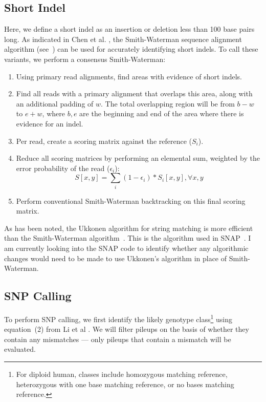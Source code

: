 \documentclass[11pt]{article}
\begin{document}
\subsection{Short Indel}
\label{sec:short-indel}

Here, we define a short indel as an insertion or deletion less than 100 base pairs long. As indicated in Chen et al.
\cite{chen09}, the Smith-Waterman sequence alignment algorithm (see~\cite{smith81}) can be used for accurately
identifying short indels. To call these variants, we perform a consensus Smith-Waterman:

\begin{enumerate}
\item Using primary read alignments, find areas with evidence of short indels.
\item Find all reads with a primary alignment that overlaps this area, along with an additional padding of $w$. The total
overlapping region will be from $b - w$ to $e + w$, where $b, e$ are the beginning and end of the area where there is
evidence for an indel.
\item Per read, create a scoring matrix against the reference ($S_i$).
\item Reduce all scoring matrices by performing an elemental sum, weighted by the error probability of the read
($\epsilon_i$):
$$
S [x, y] = \sum_i (1 - \epsilon_i) * S_i [x,y] , \forall x, y
$$
\item Perform conventional Smith-Waterman backtracking on this final scoring matrix.
\end{enumerate}

As has been noted, the Ukkonen algorithm for string matching is more efficient than the Smith-Waterman
algorithm~\cite{ukkonen85}. This is the algorithm used in SNAP~\cite{zaharia11}. I am currently looking into the SNAP
code to identify whether any algorithmic changes would need to be made to use Ukkonen's algorithm in place of
Smith-Waterman.

\subsection{SNP Calling}
\label{sec:SNP-calling}

To perform SNP calling, we first identify the likely genotype class\footnote{For diploid human, classes include homozygous
matching reference, heterozygous with one base matching reference, or no bases matching reference.} using equation~(2)
from Li et al \cite{li11}. We will filter pileups on the basis of whether they contain any mismatches --- only pileups that contain
a mismatch will be evaluated.
\end{document}
